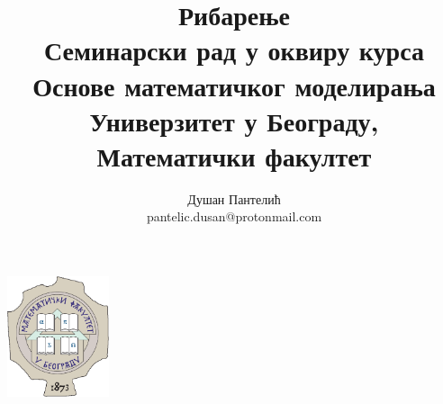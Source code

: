 \documentclass[a4paper]{article}
\begin{document}
\title{\Large Рибарење\\ \small{Семинарски рад у оквиру курса Основе математичког моделирања\\ Универзитет у Београду, Математички факултет}}

\author{Душан Пантелић\\ pantelic.dusan@protonmail.com}

\maketitle

\begin{center}
	\includegraphics[width=3cm]{images/pmf.png}
\end{center}
\end{document}
